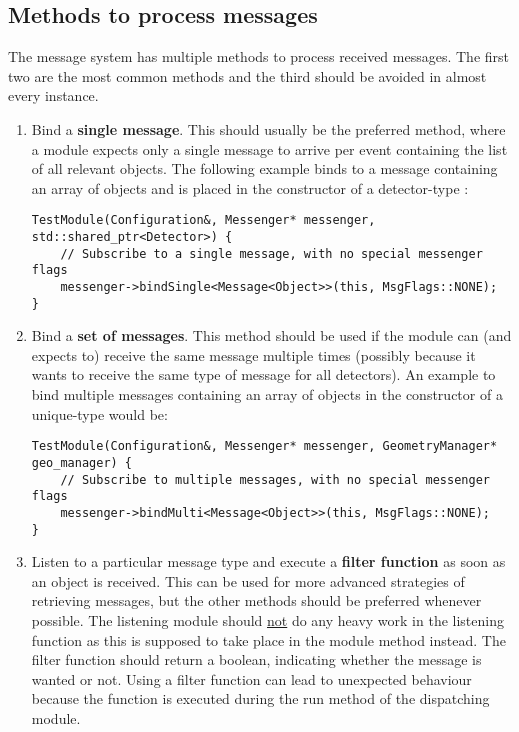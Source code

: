 \subsection{Methods to process messages}
The message system has multiple methods to process received messages.
The first two are the most common methods and the third should be avoided in almost every instance.
\begin{enumerate}
\item Bind a \textbf{single message}.
This should usually be the preferred method, where a module expects only a single message to arrive per event containing the list of all relevant objects.
The following example binds to a message containing an array of objects and is placed in the constructor of a detector-type :
\begin{verbatim}
TestModule(Configuration&, Messenger* messenger, std::shared_ptr<Detector>) {
    // Subscribe to a single message, with no special messenger flags
    messenger->bindSingle<Message<Object>>(this, MsgFlags::NONE);
}
\end{verbatim}
\item Bind a \textbf{set of messages}.
This method should be used if the module can (and expects to) receive the same message multiple times (possibly because it wants to receive the same type of message for all detectors).
An example to bind multiple messages containing an array of objects in the constructor of a unique-type  would be:
\begin{verbatim}
TestModule(Configuration&, Messenger* messenger, GeometryManager* geo_manager) {
    // Subscribe to multiple messages, with no special messenger flags
    messenger->bindMulti<Message<Object>>(this, MsgFlags::NONE);
}
\end{verbatim}
\item Listen to a particular message type and execute a \textbf{filter function} as soon as an object is received.
This can be used for more advanced strategies of retrieving messages, but the other methods should be preferred whenever possible.
The listening module should \underline{not} do any heavy work in the listening function as this is supposed to take place in the module  method instead.
The filter function should return a boolean, indicating whether the message is wanted or not.
Using a filter function can lead to unexpected behaviour because the function is executed during the run method of the dispatching module.

\end{enumerate}
